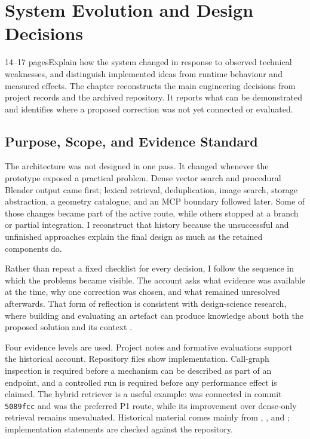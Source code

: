 \chapter{System Evolution and Design Decisions}
\label{chap:evolution}

\begin{chapterplan}{14--17 pages}{Explain how the system changed in response to observed technical weaknesses, and distinguish implemented ideas from runtime behaviour and measured effects.}
The chapter reconstructs the main engineering decisions from project records and the archived repository. It reports what can be demonstrated and identifies where a proposed correction was not yet connected or evaluated.
\end{chapterplan}

\section{Purpose, Scope, and Evidence Standard}
\label{sec:evolution-purpose}

The architecture was not designed in one pass. It changed whenever the prototype exposed a practical problem. Dense vector search and procedural Blender output came first; lexical retrieval, deduplication, image search, storage abstraction, a geometry catalogue, and an MCP boundary followed later. Some of those changes became part of the active route, while others stopped at a branch or partial integration. I reconstruct that history because the unsuccessful and unfinished approaches explain the final design as much as the retained components do.

Rather than repeat a fixed checklist for every decision, I follow the sequence in which the problems became visible. The account asks what evidence was available at the time, why one correction was chosen, and what remained unresolved afterwards. That form of reflection is consistent with design-science research, where building and evaluating an artefact can produce knowledge about both the proposed solution and its context \parencite{hevner2004,peffers2007,wieringa2014}.

Four evidence levels are used. Project notes and formative evaluations support the historical account. Repository files show implementation. Call-graph inspection is required before a mechanism can be described as part of an endpoint, and a controlled run is required before any performance effect is claimed. The hybrid retriever is a useful example:  was connected in commit \texttt{5089fcc} and was the preferred P1 route, while its improvement over dense-only retrieval remains unevaluated. Historical material comes mainly from , , and ; implementation statements are checked against the repository.

